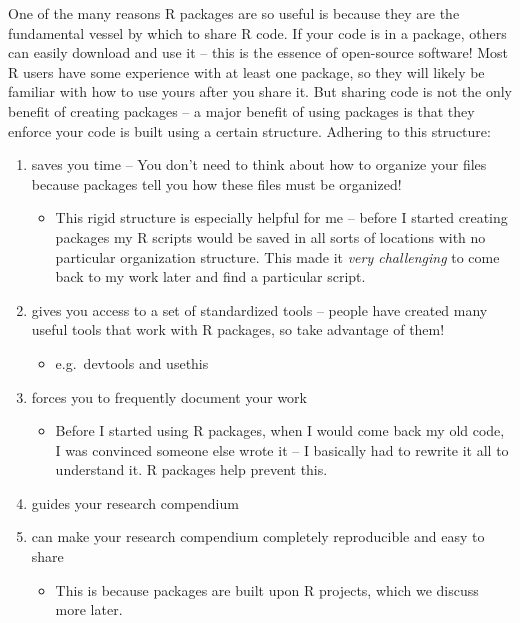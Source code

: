 \documentclass[
]{book}
\providecommand{\tightlist}{%
  \setlength{\itemsep}{0pt}\setlength{\parskip}{0pt}}
\begin{document}
One of the many reasons R packages are so useful is because they are the fundamental vessel by which to share R code. If your code is in a package, others can easily download and use it -- this is the essence of open-source software! Most R users have some experience with at least one package, so they will likely be familiar with how to use yours after you share it. But sharing code is not the only benefit of creating packages -- a major benefit of using packages is that they enforce your code is built using a certain structure. Adhering to this structure:

\begin{enumerate}
\def\labelenumi{\arabic{enumi}.}
\tightlist
\item
  saves you time -- You don't need to think about how to organize your files because packages tell you how these files must be organized!

  \begin{itemize}
  \tightlist
  \item
    This rigid structure is especially helpful for me -- before I started creating packages my R scripts would be saved in all sorts of locations with no particular organization structure. This made it \emph{very challenging} to come back to my work later and find a particular script.
  \end{itemize}
\item
  gives you access to a set of standardized tools -- people have created many useful tools that work with R packages, so take advantage of them!

  \begin{itemize}
  \tightlist
  \item
    e.g.~devtools and usethis
  \end{itemize}
\item
  forces you to frequently document your work

  \begin{itemize}
  \tightlist
  \item
    Before I started using R packages, when I would come back my old code, I was convinced someone else wrote it -- I basically had to rewrite it all to understand it. R packages help prevent this.
  \end{itemize}
\item
  guides your research compendium
\item
  can make your research compendium completely reproducible and easy to share

  \begin{itemize}
  \tightlist
  \item
    This is because packages are built upon R projects, which we discuss more later.
  \end{itemize}
\end{enumerate}
\end{document}
